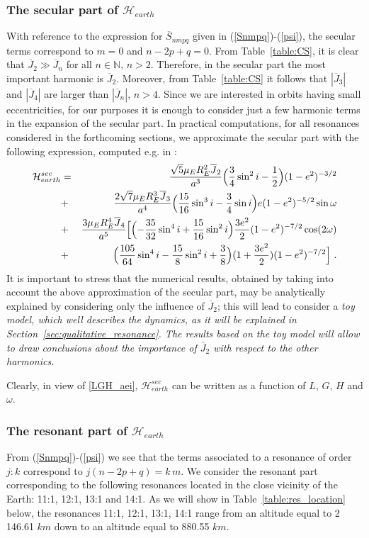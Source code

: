 \documentclass[12pt,reqno]{amsart}
\numberwithin{equation}{section}
\newcommand\beqa[1]{ \begin{eqnarray} \label{#1}}
\newcommand{\eeqa}{ \end{eqnarray} }
\newcommand\equ[1]{{\rm (\ref{#1})}}
\begin{document}
\subsubsection{The secular part of $\mathcal{H}_{earth}$}\label{sec:secular}
With reference to the expression for $\overline{S}_{nmpq}$ given in \equ{Snmpq}-\equ{psi}, the secular terms correspond to $m=0$ and $n-2p+q=0$. From Table~\ref{table:CS}, it is clear
that $\overline{J}_2\gg \overline{J}_n$ for all $n \in \mathbb{N}$, $n>2$.
Therefore, in the secular part the most important harmonic is $\overline{J}_2$. Moreover,
from Table~\ref{table:CS} it follows that $|\overline{J}_3|$ and $|\overline{J}_4|$ are larger than $|\overline{J}_n|$, $n>4$.  Since we are interested in orbits having small eccentricities, for our purposes it is enough to consider just a few harmonic terms in the expansion of the secular part.
In practical computations, for all resonances considered in the forthcoming sections, we approximate the secular part with the following expression,
computed e.g. in \cite{CGmajor}:
\beqa{Rsec}
\mathcal{H}_{earth}^{sec}&=&\frac{\sqrt{5} \mu_E R^2_E  \overline{J}_{2}}{a^3} \Bigl(\frac{3}{4} \sin^2 i -\frac{1}{2}\Bigr) (1-e^2)^{-3/2} \nonumber\\
&+&\frac{2 \sqrt{7}\mu_E R^3_E  \overline{J}_{3}}{a^4} \Bigl(\frac{15}{16} \sin^3 i -\frac{3}{4} \sin i\Bigr) e (1-e^2)^{-5/2} \sin \omega \nonumber \\
&+&\frac{3 \mu_E R^4_E \overline{J}_{4}}{a^5} \Bigl[\Bigl(-\frac{35}{32} \sin^4 i +\frac{15}{16} \sin^2 i\Bigr) \frac{3e^2}{2}(1-e^2)^{-7/2} \cos(2\omega) \nonumber \\
&+&
\Bigl(\frac{105}{64} \sin^4 i -\frac{15}{8} \sin^2 i+\frac{3}{8}\Bigr) (1+\frac{3e^2}{2})(1-e^2)^{-7/2} \Bigr]\ .
\eeqa
It is important to stress that the numerical results, obtained by taking into account the above approximation
of the secular part, may be analytically explained by considering only the influence of $\overline{J}_2$;
this will lead to consider a \sl toy model, \rm which well describes the dynamics,
as it will be explained in Section~\ref{sec:qualitative_resonance}.
The results based on the toy model will allow to draw conclusions about the importance
of $\overline{J}_2$ with respect to the other harmonics.

Clearly, in view of \eqref{LGH_aei}, $\mathcal{H}_{earth}^{sec}$ can be written as a function of $L$, $G$, $H$ and $\omega$.



\subsubsection{The resonant part of $\mathcal{H}_{earth}$}\label{sec:resonant}
From \equ{Snmpq}-\equ{psi} we see that the terms associated to a resonance of order $j:k$ correspond to $j(n-2p+q)=k\, m$.
We consider the resonant part corresponding to the following resonances located in the close vicinity of the Earth:
11:1, 12:1, 13:1 and 14:1. As we will show in Table~\ref{table:res_location} below, the resonances
11:1, 12:1, 13:1, 14:1 range from an altitude equal to 2\,146.61 $km$ down to an altitude equal to
880.55 $km$.
\end{document}
